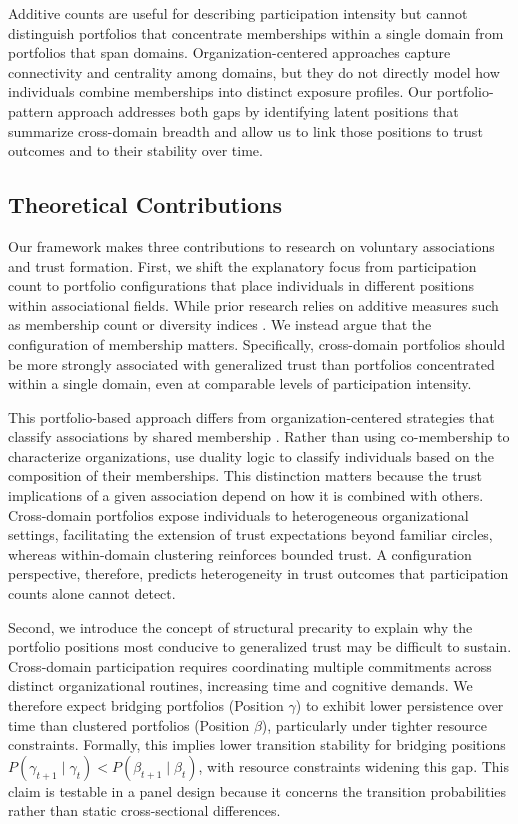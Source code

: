 Additive counts are useful for describing participation intensity but cannot distinguish portfolios that concentrate memberships within a single domain from portfolios that span domains. Organization-centered approaches capture connectivity and centrality among domains, but they do not directly model how individuals combine memberships into distinct exposure profiles. Our portfolio-pattern approach addresses both gaps by identifying latent positions that summarize cross-domain breadth and allow us to link those positions to trust outcomes and to their stability over time.

\subsection{Theoretical Contributions}

Our framework makes three contributions to research on voluntary associations and trust formation. First, we shift the explanatory focus from participation count to portfolio configurations that place individuals in different positions within associational fields. While prior research relies on additive measures such as membership count or diversity indices \parencite{glanville_voluntary_2004, paxton_association_2007}. We instead argue that the configuration of membership matters. Specifically, cross-domain portfolios should be more strongly associated with generalized trust than portfolios concentrated within a single domain, even at comparable levels of participation intensity.

This portfolio-based approach differs from organization-centered strategies that classify associations by shared membership \parencite{paxton_association_2007}. Rather than using co-membership to characterize organizations, use duality logic to classify individuals based on the composition of their memberships. This distinction matters because the trust implications of a given association depend on how it is combined with others. Cross-domain portfolios expose individuals to heterogeneous organizational settings, facilitating the extension of trust expectations beyond familiar circles, whereas within-domain clustering reinforces bounded trust. A configuration perspective, therefore, predicts heterogeneity in trust outcomes that participation counts alone cannot detect.

Second, we introduce the concept of structural precarity to explain why the portfolio positions most conducive to generalized trust may be difficult to sustain. Cross-domain participation requires coordinating multiple commitments across distinct organizational routines, increasing time and cognitive demands. We therefore expect bridging portfolios (Position $\gamma$) to exhibit lower persistence over time than clustered portfolios (Position $\beta$), particularly under tighter resource constraints. Formally, this implies lower transition stability for bridging positions $P(\gamma_{t+1}\mid \gamma_t) < P(\beta_{t+1}\mid \beta_t)$, with resource constraints widening this gap. This claim is testable in a panel design because it concerns the transition probabilities rather than static cross-sectional differences.

